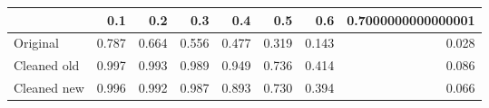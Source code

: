 \begin{tabular}{lrrrrrrr}
\toprule
{} &   0.1 &   0.2 &   0.3 &   0.4 &   0.5 &   0.6 & 0.7000000000000001 \\
\midrule
Original    & 0.787 & 0.664 & 0.556 & 0.477 & 0.319 & 0.143 &              0.028 \\
Cleaned old & 0.997 & 0.993 & 0.989 & 0.949 & 0.736 & 0.414 &              0.086 \\
Cleaned new & 0.996 & 0.992 & 0.987 & 0.893 & 0.730 & 0.394 &              0.066 \\
\bottomrule
\end{tabular}
